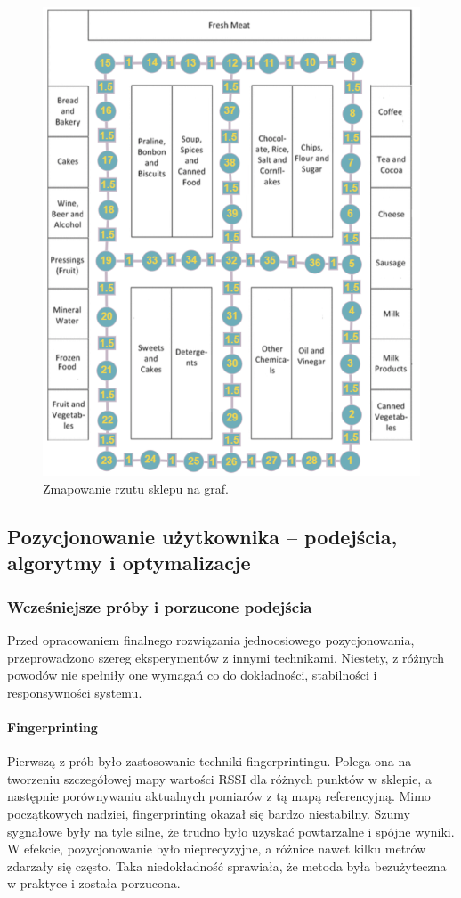 \begin{figure}[H]
\begin{minipage}{0.45\linewidth}
\includegraphics[width=\textwidth]{images/graf_sklepu.png}
\caption{Zmapowanie rzutu sklepu na graf.}
\label{fig:graf_sklepu}
\end{minipage}
\end{figure}


\subsection{Pozycjonowanie użytkownika – podejścia, algorytmy i optymalizacje}

\subsubsection{Wcześniejsze próby i porzucone podejścia}
Przed opracowaniem finalnego rozwiązania jednoosiowego pozycjonowania, przeprowadzono szereg eksperymentów z innymi technikami. Niestety, z różnych powodów nie spełniły one wymagań co do dokładności, stabilności i responsywności systemu.

\paragraph{Fingerprinting}
Pierwszą z prób było zastosowanie techniki fingerprintingu. Polega ona na tworzeniu szczegółowej mapy wartości RSSI dla różnych punktów w sklepie, a następnie porównywaniu aktualnych pomiarów z tą mapą referencyjną. Mimo początkowych nadziei, fingerprinting okazał się bardzo niestabilny. Szumy sygnałowe były na tyle silne, że trudno było uzyskać powtarzalne i spójne wyniki. W efekcie, pozycjonowanie było nieprecyzyjne, a różnice nawet kilku metrów zdarzały się często. Taka niedokładność sprawiała, że metoda była bezużyteczna w praktyce i została porzucona.

